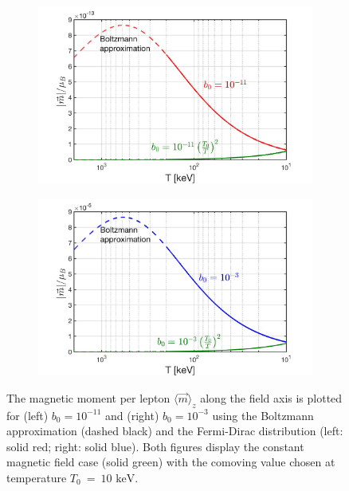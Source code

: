 \documentclass[a4paper]{article}
\newcommand*{\keV}{\text{ keV}}
\begin{document}
\begin{figure}[ht]
    \centering
    \begin{subfigure}[b]{0.49\textwidth}
        \includegraphics[width=\textwidth]{NewMagnetizationDensity001_Boltz.jpg}
    \end{subfigure}
    \hfill
    \begin{subfigure}[b]{0.49\textwidth}
        \includegraphics[width=\textwidth]{NewMagnetizationDensity002_Boltz.jpg}
    \end{subfigure}
    \caption{The magnetic moment per lepton $\langle\vec{m}\rangle_{z}$ along the field axis is plotted for (left) $b_{0}=10^{-11}$ and (right) $b_{0}=10^{-3}$ using the Boltzmann approximation (dashed black) and the Fermi-Dirac distribution (left: solid red; right: solid blue). Both figures display the constant magnetic field case (solid green) with the comoving value chosen at temperature $T_{0}~=~10\keV$.}
    \label{fig:momentperlepton}
\end{figure}
\end{document}
